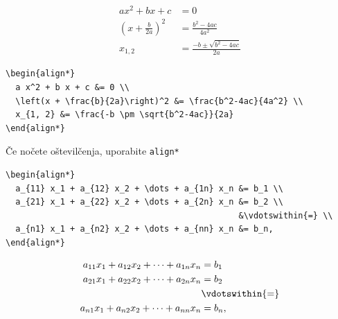 \documentclass[aspectratio=169]{beamer}
\begin{document}
\begin{frame}[fragile]{}
  \begin{align*}
    a x^2 + b x + c &= 0 \\
    \left(x + \frac{b}{2a}\right)^2 &= \frac{b^2-4ac}{4a^2} \\
    x_{1, 2} &= \frac{-b \pm \sqrt{b^2-4ac}}{2a}
  \end{align*}

  \begin{verbatim}
\begin{align*}
  a x^2 + b x + c &= 0 \\
  \left(x + \frac{b}{2a}\right)^2 &= \frac{b^2-4ac}{4a^2} \\
  x_{1, 2} &= \frac{-b \pm \sqrt{b^2-4ac}}{2a}
\end{align*}
  \end{verbatim}
\end{frame}

\begin{frame}[fragile]{Če nočete oštevilčenja, uporabite \texttt{align*}}
  \begin{dobroenv}
    \begin{verbatim}
\begin{align*}
  a_{11} x_1 + a_{12} x_2 + \dots + a_{1n} x_n &= b_1 \\
  a_{21} x_1 + a_{22} x_2 + \dots + a_{2n} x_n &= b_2 \\
                                               &\vdotswithin{=} \\
  a_{n1} x_1 + a_{n2} x_2 + \dots + a_{nn} x_n &= b_n,
\end{align*}
    \end{verbatim}
    \small
    \begin{align*}
      a_{11} x_1 + a_{12} x_2 + \dots + a_{1n} x_n &= b_1 \\
      a_{21} x_1 + a_{22} x_2 + \dots + a_{2n} x_n &= b_2 \\
      &\vdotswithin{=} \\
      a_{n1} x_1 + a_{n2} x_2 + \dots + a_{nn} x_n &= b_n,
    \end{align*}
  \end{dobroenv}
\end{frame}
\end{document}
